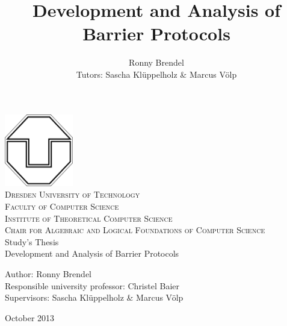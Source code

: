 \documentclass[a4paper, 10pt]{article}
\title{Development and Analysis of Barrier Protocols}
\author{Ronny Brendel\\Tutors: Sascha Kl\"uppelholz \& Marcus V\"olp}
\begin{document}
\begin{titlepage}

\begin{center}
\includegraphics[width=3cm]{tu-logo}~\\[1cm]
\textsc{\LARGE Dresden University of Technology}\\[0.5cm]
\textsc{\Large Faculty of Computer Science}\\[0.2cm]
\textsc{\large Institute of Theoretical Computer Science}\\[0.2cm]
\textsc{\large Chair for Algebraic and Logical Foundations of Computer Science}\\[3cm]
\Huge Study's Thesis \\[1cm]
\huge Development and Analysis of Barrier Protocols\\[3cm]
\end{center}

\begin{flushleft} \large
	Author: Ronny Brendel \\
	Responsible university professor: Christel Baier \\
	Supervisors: Sascha Kl\"uppelholz \& Marcus V\"olp
\end{flushleft}

\vfill
\begin{flushright}
	\large October 2013
\end{flushright}

\end{titlepage}

\pagebreak
\newpage \thispagestyle{empty} \mbox{}
\pagebreak

\thispagestyle{empty}
\end{document}
